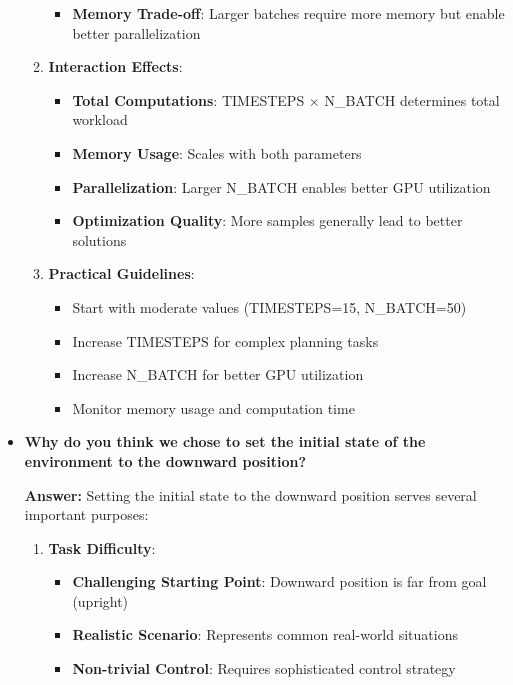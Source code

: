 \begin{itemize}
\begin{enumerate}
\begin{itemize}
            \item \textbf{Memory Trade-off}: Larger batches require more memory but enable better parallelization
        \end{itemize}
        
        \item \textbf{Interaction Effects}:
        \begin{itemize}
            \item \textbf{Total Computations}: TIMESTEPS × N\_BATCH determines total workload
            \item \textbf{Memory Usage}: Scales with both parameters
            \item \textbf{Parallelization}: Larger N\_BATCH enables better GPU utilization
            \item \textbf{Optimization Quality}: More samples generally lead to better solutions
        \end{itemize}
        
        \item \textbf{Practical Guidelines}:
        \begin{itemize}
            \item Start with moderate values (TIMESTEPS=15, N\_BATCH=50)
            \item Increase TIMESTEPS for complex planning tasks
            \item Increase N\_BATCH for better GPU utilization
            \item Monitor memory usage and computation time
        \end{itemize}
    \end{enumerate}
    
    \item \textbf{Why do you think we chose to set the initial state of the environment to the downward position?}
    
    \textbf{Answer:} Setting the initial state to the downward position serves several important purposes:
    
    \begin{enumerate}
        \item \textbf{Task Difficulty}:
        \begin{itemize}
            \item \textbf{Challenging Starting Point}: Downward position is far from goal (upright)
            \item \textbf{Realistic Scenario}: Represents common real-world situations
            \item \textbf{Non-trivial Control}: Requires sophisticated control strategy
        \end{itemize}
        

\end{enumerate}
\end{itemize}

